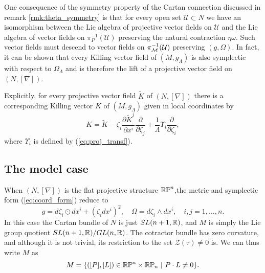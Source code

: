 One consequence of the symmetry property of the Cartan connection discussed in remark \ref{rmk:theta_symmetry} is that for every open set $\mathcal{U}\subset N$ we have an isomorphism between the Lie algebra of projective vector fields on $\mathcal{U}$ and the Lie algebra of vector fields on $\pi_P^{-1}(\mathcal{U})$ preserving the natural contraction $\eta\omega$. Such vector fields must descend to vector fields on $\pi_{\mathcal{M}}^{-1}(\mathcal{U})$ preserving $(g,\Omega)$. In fact, it can be shown that every Killing vector field of $(M,g_\Lambda)$ is also symplectic with respect to $\Omega_\Lambda$ and is therefore the lift of a projective vector field on $(N,[\nabla])$.

Explicitly, for every projective vector field $\tilde{K}$ of $(N,[\nabla])$
there is a corresponding Killing vector $K$ of $(M,g_{\Lambda})$
given in local coordinates by 
\begin{equation}
{K}=\tilde{K}-\zeta_{i}\frac{\partial \tilde{K}^{j}}{\partial x^{i}}\frac{\partial}{\partial \zeta_{j}}+\frac{1}{\Lambda}\Upsilon_{i}\frac{\partial}{\partial \zeta_{i}},\label{eq:kvf_from_pvf}
\end{equation}
where $\Upsilon_{i}$ is defined by (\ref{eq:proj_transf}).

\subsection{The model case} \label{sec:intro_model}
When $(N,[\nabla])$ is the flat projective structure $\mathbb{RP}^n$,the metric and symplectic form (\ref{eq:coord_form}) reduce to
\[
g = d\zeta_i\odot dx^i + (\zeta_idx^i)^2, \quad \Omega = d\zeta_i\wedge dx^i,\quad i,j=1,\dots,n.
\]
In this case the Cartan bundle of $N$ is just $SL(n+1,\mathbb{R})$, and $M$ is simply the Lie group quotient $SL(n+1,\mathbb{R})/GL(n,\mathbb{R})$. The cotractor bundle has zero curvature, and although it is not trivial, its restriction to the set $\mathcal{Z}(\tau)\neq 0$ is. %
We can thus write $M$ as
\[
M=\{([P],[L])\in\RP^n\times\RP_n\ |\ P\cdot L\neq 0\}.
\]

